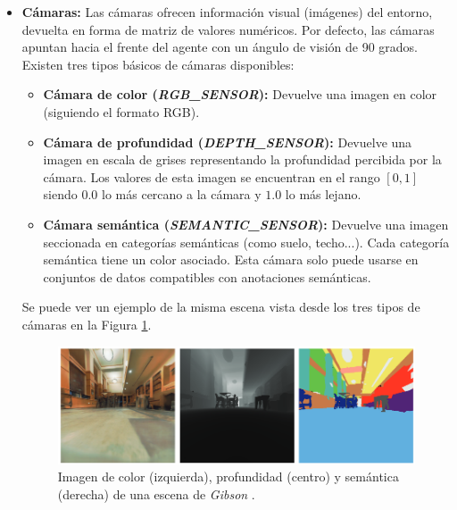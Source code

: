 \begin{itemize}
	\item \textbf{Cámaras:} Las cámaras ofrecen información visual (imágenes) del entorno, devuelta en forma de matriz de valores numéricos. Por defecto, las cámaras apuntan hacia el frente del agente con un ángulo de visión de 90 grados. Existen tres tipos básicos de cámaras disponibles:
	\begin{itemize}
		\item \textbf{Cámara de color (\textit{RGB{\_}SENSOR}):} Devuelve una imagen en color (siguiendo el formato RGB).
		\item \textbf{Cámara de profundidad (\textit{DEPTH{\_}SENSOR}):} Devuelve una imagen en escala de grises representando la profundidad percibida por la cámara. Los valores de esta imagen se encuentran en el rango $[0, 1]$ siendo $0.0$ lo más cercano a la cámara y $1.0$ lo más lejano.
		\item \textbf{Cámara semántica (\textit{SEMANTIC{\_}SENSOR}):} Devuelve una imagen seccionada en categorías semánticas (como suelo, techo...). Cada categoría semántica tiene un color asociado. Esta cámara solo puede usarse en conjuntos de datos compatibles con anotaciones semánticas. 
	\end{itemize}
	
	Se puede ver un ejemplo de la misma escena vista desde los tres tipos de cámaras en la Figura \ref{fig:chap4-cameras}.
	
	\begin{figure}[h]
    \centering
    \includegraphics[width=\textwidth]{imagenes/cap4/cameras.png}
    \caption{Imagen de color (izquierda), profundidad (centro) y semántica (derecha) de una escena de \textit{Gibson} \cite{xiazamirhe2018gibsonenv}.}
    \label{fig:chap4-cameras}
\end{figure}		


\end{itemize}
